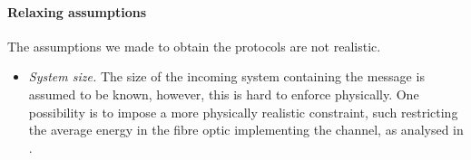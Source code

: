 \documentclass{article}
\begin{document}
\paragraph{Relaxing assumptions} The assumptions we made to obtain the protocols are not realistic.
\begin{itemize}
  \item \emph{System size.} The size of the incoming system containing the
        message is assumed to be known, however, this is hard to enforce physically.
        One possibility is to impose a more physically realistic constraint, such restricting the average energy in the fibre optic implementing the channel, as analysed in \cite{Himbeeck2017}.




\end{itemize}
\end{document}
